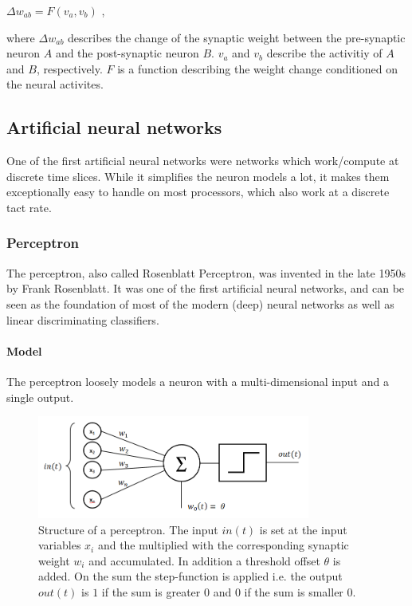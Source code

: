 $\Delta w_{ab} = F( v_a, v_b) $ , 

where $\Delta w_{ab}$ describes the change of the synaptic weight between the pre-synaptic neuron $A$ and the post-synaptic neuron $B$. 
$v_a$ and $v_b$ describe the activitiy of $A$ and $B$, respectively. 
$F$ is a function describing the weight change conditioned on the neural activites.     


\subsection{Artificial neural networks}

One of the first artificial neural networks were networks which work/compute at discrete time slices.
While it simplifies the neuron models a lot, it makes them exceptionally easy to handle on most processors, which also work at a discrete tact rate.

\subsubsection{Perceptron}

The perceptron, also called Rosenblatt Perceptron, was invented in the late 1950s by Frank Rosenblatt. 
It was one of the first artificial neural networks, and can be seen as the foundation of most of the modern (deep) neural networks as well as linear discriminating classifiers. 

\paragraph{Model}

The perceptron loosely models a neuron with a multi-dimensional input and a single output. 

\begin{figure}
	\centering
    	\includegraphics[width=0.8\textwidth]{imgs/percept.png} 
    \caption{Structure of a perceptron. The input $in(t)$ is set at the input variables $x_i$ and the multiplied with the corresponding synaptic weight $w_i$ and accumulated. In addition a threshold offset $\theta$ is added. On the sum the step-function is applied i.e. the output $out(t)$ is $1$ if the sum is greater $0$ and $0$ if the sum is smaller $0$.}
	\label{fig:perceptron}
\end{figure}

